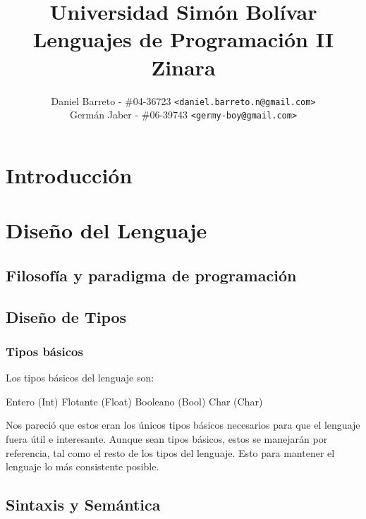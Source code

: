 \documentclass[12pt, spanish]{report}
\begin{document}
\title{Universidad Simón Bolívar \\ Lenguajes de Programación II \\ Zinara}
\author{
  Daniel Barreto - \#04-36723 \texttt{<daniel.barreto.n@gmail.com>} \\
  Germán Jaber - \#06-39743 \texttt{<germy-boy@gmail.com>}
}
\maketitle

\tableofcontents

\newpage

\chapter{Introducción}
\label{chap:intr}



\chapter{Diseño del Lenguaje}
\label{chap:diseno}


\section{Filosofía y paradigma de programación}
\label{sec:filpar}


\section{Diseño de Tipos}
\label{sec:tipos}

\subsection{Tipos básicos}
\label{sec:tiposbasicos}
Los tipos básicos del lenguaje son:
\begin{itemize}
Entero   (Int)
Flotante (Float)
Booleano (Bool)
Char     (Char)
\end{itemize}
Nos pareció que estos eran los únicos tipos básicos necesarios
para que el lenguaje fuera útil e interesante.%
Aunque sean tipos básicos, estos se manejarán por referencia,
tal como el resto de los tipos del lenguaje. Esto para mantener
el lenguaje lo más consistente posible.

\section{Sintaxis y Semántica}
\label{sec:synsem}
\end{document}
